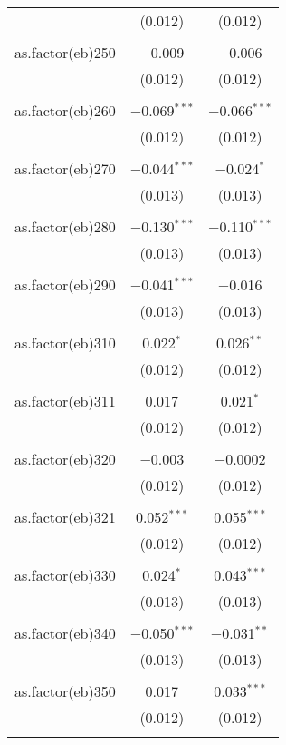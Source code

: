 \begin{table}[!htbp]
\begin{tabular}{@{\extracolsep{5pt}}lcc}
  & (0.012) & (0.012) \\ 
  & & \\ 
 as.factor(eb)250 & $-$0.009 & $-$0.006 \\ 
  & (0.012) & (0.012) \\ 
  & & \\ 
 as.factor(eb)260 & $-$0.069$^{***}$ & $-$0.066$^{***}$ \\ 
  & (0.012) & (0.012) \\ 
  & & \\ 
 as.factor(eb)270 & $-$0.044$^{***}$ & $-$0.024$^{*}$ \\ 
  & (0.013) & (0.013) \\ 
  & & \\ 
 as.factor(eb)280 & $-$0.130$^{***}$ & $-$0.110$^{***}$ \\ 
  & (0.013) & (0.013) \\ 
  & & \\ 
 as.factor(eb)290 & $-$0.041$^{***}$ & $-$0.016 \\ 
  & (0.013) & (0.013) \\ 
  & & \\ 
 as.factor(eb)310 & 0.022$^{*}$ & 0.026$^{**}$ \\ 
  & (0.012) & (0.012) \\ 
  & & \\ 
 as.factor(eb)311 & 0.017 & 0.021$^{*}$ \\ 
  & (0.012) & (0.012) \\ 
  & & \\ 
 as.factor(eb)320 & $-$0.003 & $-$0.0002 \\ 
  & (0.012) & (0.012) \\ 
  & & \\ 
 as.factor(eb)321 & 0.052$^{***}$ & 0.055$^{***}$ \\ 
  & (0.012) & (0.012) \\ 
  & & \\ 
 as.factor(eb)330 & 0.024$^{*}$ & 0.043$^{***}$ \\ 
  & (0.013) & (0.013) \\ 
  & & \\ 
 as.factor(eb)340 & $-$0.050$^{***}$ & $-$0.031$^{**}$ \\ 
  & (0.013) & (0.013) \\ 
  & & \\ 
 as.factor(eb)350 & 0.017 & 0.033$^{***}$ \\ 
  & (0.012) & (0.012) \\ 
  & & \\ 

\end{tabular}
\end{table}
